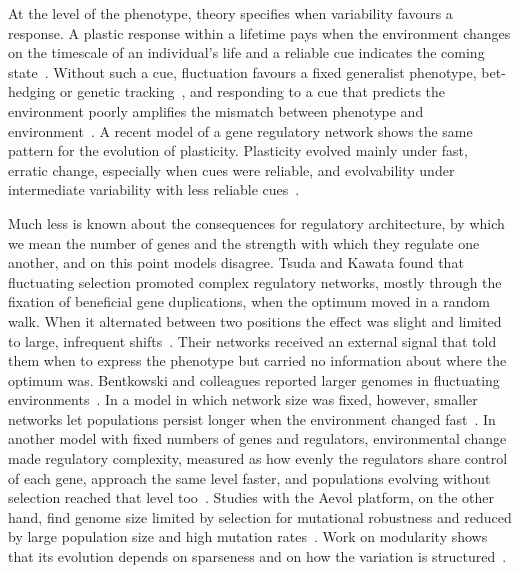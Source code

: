 \documentclass[10pt,letterpaper]{article}
\begin{document}
At the level of the phenotype, theory specifies when variability favours a
response. A plastic response within a lifetime pays when the environment changes
on the timescale of an individual's life and a reliable cue indicates the coming
state~\cite{levins1968,moran1992,kussell2005,botero2015}. Without such a cue,
fluctuation favours a fixed generalist phenotype, bet-hedging or genetic
tracking~\cite{kussell2005,botero2015}, and responding to a cue that predicts the
environment poorly amplifies the mismatch between phenotype and
environment~\cite{ashander2016}. A recent model of a gene regulatory
network shows the same pattern for the evolution of plasticity. Plasticity
evolved mainly under fast, erratic change, especially when cues were reliable,
and evolvability under intermediate variability with less reliable
cues~\cite{jorritsma2026}.

Much less is known about the consequences for regulatory architecture, by which
we mean the number of genes and the strength with which they regulate one
another, and on this point models disagree. Tsuda and Kawata found that fluctuating
selection promoted complex regulatory networks, mostly through the fixation of
beneficial gene duplications, when the optimum moved in a random walk. When it
alternated between two positions the effect was slight and limited to large,
infrequent shifts~\cite{tsuda2010}. Their networks received an external signal
that told them when to express the phenotype but carried no information about
where the optimum was. Bentkowski
and colleagues reported larger genomes in fluctuating
environments~\cite{bentkowski2015}. In a model in which network size was fixed,
however, smaller networks let populations persist longer when the environment
changed fast~\cite{malcom2011}. In another model with fixed numbers of genes and
regulators, environmental change made regulatory complexity, measured as how
evenly the regulators share control of each gene, approach the same level
faster, and populations evolving without selection reached that level
too~\cite{chapel2026}. Studies with the Aevol platform, on the other
hand, find genome size limited by selection for mutational robustness and
reduced by large population size and high mutation
rates~\cite{knibbe2007,luiselli2024}. Work on modularity shows that its evolution
depends on sparseness and on how the variation is
structured~\cite{espinosasoto2018,kashtan2005}.
\end{document}
